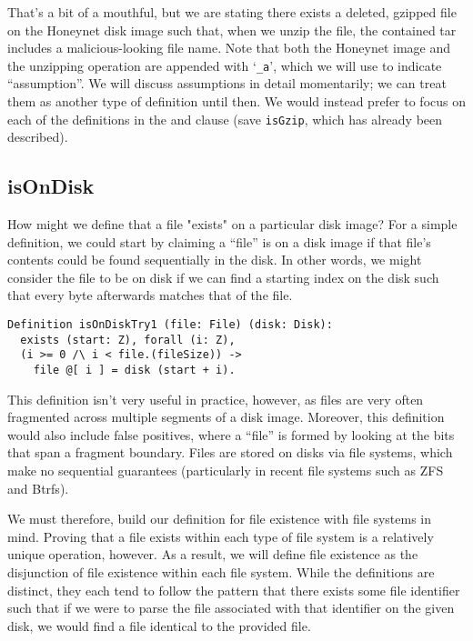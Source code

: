 \documentclass[nocopyrightspace]{sigplanconf}
\begin{document}
That's a bit of a mouthful, but we are stating there exists a deleted, gzipped
file on the Honeynet disk image such that, when we unzip the file, the
contained tar includes a malicious-looking file name. Note that both the
Honeynet image and the unzipping operation are appended with `{\tt \_a}',
which we will use to indicate ``assumption''. We will discuss assumptions in
detail momentarily; we can treat them as another type of definition until
then. We would instead prefer to focus on each of the definitions in the and
clause (save {\tt isGzip}, which has already been described).

\subsection{isOnDisk}

How might we define that a file "exists" on a particular disk image? For a
simple definition, we could start by claiming a ``file'' is on a disk image if
that file's contents could be found sequentially in the disk. In other words,
we might consider the file to be on disk if we can find a starting index on
the disk such that every byte afterwards matches that of the file.

\begin{lstlisting}
Definition isOnDiskTry1 (file: File) (disk: Disk):
  exists (start: Z), forall (i: Z),
  (i >= 0 /\ i < file.(fileSize)) -> 
    file @[ i ] = disk (start + i).
\end{lstlisting}

This definition isn't very useful in practice, however, as files are very
often fragmented across multiple segments of a disk image. Moreover, this
definition would also include false positives, where a ``file'' is formed by
looking at the bits that span a fragment boundary. Files are stored on disks
via file systems, which make no sequential guarantees (particularly in recent
file systems such as ZFS and Btrfs).

We must therefore, build our definition for file existence with file systems
in mind. Proving that a file exists within each type of file system is a
relatively unique operation, however. As a result, we will define file
existence as the disjunction of file existence within each file system. While
the definitions are distinct, they each tend to follow the pattern that there
exists some file identifier such that if we were to parse the file associated
with that identifier on the given disk, we would find a file identical to the
provided file.
\end{document}
